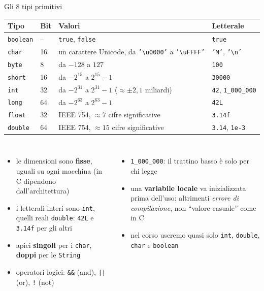 \documentclass[10pt,aspectratio=169]{beamer}
\begin{document}
\begin{frame}[fragile]{Gli 8 tipi primitivi}
\begin{center}\small
\renewcommand{\arraystretch}{1.15}
\begin{tabular}{llll}
\toprule
\textbf{Tipo} & \textbf{Bit} & \textbf{Valori} & \textbf{Letterale} \\
\midrule
\texttt{boolean} & -- & \texttt{true}, \texttt{false} & \texttt{true} \\
\texttt{char} & 16 & un carattere Unicode, da \texttt{'\textbackslash u0000'} a \texttt{'\textbackslash uFFFF'} & \texttt{'M'}, \texttt{'\textbackslash n'} \\
\texttt{byte} & 8 & da $-128$ a $127$ & \texttt{100} \\
\texttt{short} & 16 & da $-2^{15}$ a $2^{15}-1$ & \texttt{30000} \\
\texttt{int} & 32 & da $-2^{31}$ a $2^{31}-1$ ($\approx \pm 2{,}1$ miliardi) & \texttt{42}, \texttt{1\_000\_000} \\
\texttt{long} & 64 & da $-2^{63}$ a $2^{63}-1$ & \texttt{42L} \\
\texttt{float} & 32 & IEEE 754, $\approx 7$ cifre significative & \texttt{3.14f} \\
\texttt{double} & 64 & IEEE 754, $\approx 15$ cifre significative & \texttt{3.14}, \texttt{1e-3} \\
\bottomrule
\end{tabular}
\end{center}

\begin{columns}[T]
\small
\begin{itemize}\itemsep=2pt
    \item le dimensioni sono \textbf{fisse}, uguali su ogni macchina (in C dipendono dall'architettura)
    \item i letterali interi sono \texttt{int}, quelli reali \texttt{double}: \texttt{42L} e \texttt{3.14f} per gli altri
    \item apici \textbf{singoli} per i \texttt{char}, \textbf{doppi} per le \texttt{String}
    \item operatori logici: \texttt{\&\&} (and), \texttt{||} (or), \texttt{!} (not)
\end{itemize}
\small
\begin{itemize}\itemsep=2pt
    \item \texttt{1\_000\_000}: il trattino basso è solo per chi legge
    \item una \textbf{variabile locale} va inizializzata prima dell'uso: altrimenti \emph{errore di compilazione}, non ``valore casuale'' come in C
    \item nel corso useremo quasi solo \texttt{int}, \texttt{double}, \texttt{char} e \texttt{boolean}
\end{itemize}
\end{columns}
\end{frame}
\end{document}
